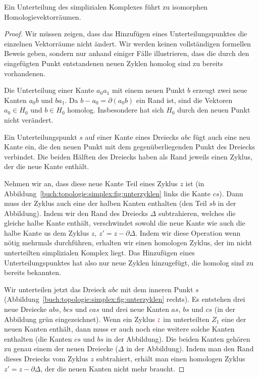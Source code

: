 \begin{satz}
\label{buch:topologie:eulercharakteristik:satz:homologieunterteilung}
Ein Unterteilung des simplizialen Komplexes führt zu isomorphen
Homologievektorräumen.
\end{satz}

\begin{proof}
%
Wir müssen zeigen, dass das Hinzufügen eines Unterteilungspunktes 
die einzelnen Vektorräume nicht ändert.
Wir werden keinen vollständigen formellen Beweis geben, sondern
nur anhand einiger Fälle illustrieren, dass die durch den eingefügten
Punkt entstandenen neuen Zyklen homolog sind zu bereits vorhandenen.

Die Unterteilung einer Kante $a_0a_1$ mit einem neuen Punkt $b$ erzeugt
zwei neue Kanten $a_0b$ und $ba_1$.
Da $b-a_0=\partial (a_0b)$ ein Rand ist, sind die Vektoren $a_0\in H_0$
und $b\in H_0$ homolog.
Insbesondere hat sich $H_0$ durch den neuen Punkt nicht verändert.

Ein Unterteilungspunkt $s$ auf einer Kante eines Dreiecks $abc$ fügt auch
eine neu Kante ein, die den neuen Punkt mit dem gegenüberliegenden
Punkt des Dreiecks verbindet.
Die beiden Hälften des Dreiecks haben als Rand jeweils einen Zyklus,
der die neue Kante enthält.

Nehmen wir an, dass diese neue Kante Teil eines Zyklus $z$ ist
(in Abbildung~\ref{buch:topologie:simplex:fig:unterzyklen} links
die Kante $cs$).
Dann muss der Zyklus auch eine der halben Kanten enthalten (den
Teil $sb$ in der Abbildung).
Indem wir den Rand des Dreiecks $\Delta$ subtrahieren, welches die gleiche
halbe Kante enthält, verschwindet sowohl die neue Kante wie auch die
halbe Kante us dem Zyklus $z$, $z'=z-\partial\Delta$.
Indem wir diese Operation wenn nötig mehrmals durchführen, erhalten
wir einen homologen Zyklus, der im nicht unterteilten simplizialen
Komplex liegt.
Das Hinzufügen eines Unterteilungspunktes hat also nur neue Zyklen
hinzugefügt, die homolog sind zu bereits bekannten.

Wir unterteilen jetzt das Dreieck $abc$ mit dem inneren Punkt $s$
(Abbildung~\ref{buch:topologie:simplex:fig:unterzyklen} rechts).
Es entstehen drei neue Dreiecke $abs$, $bcs$ und $cas$ und drei neue
Kanten $as$, $bs$ und $cs$ (in der Abbildung {\color{darkgreen}grün}
eingezeichnet).
Wenn ein Zyklus ${\color{darkred}z}$ im unterteilten $Z_1$ eine der
neuen Kanten enthält, dann muss er auch noch eine weitere solche
Kanten enthalten (die Kanten $cs$ und $bs$ in der Abbildung).
Die beiden Kanten gehören zu genau einem der neuen Dreiecke ($\Delta$
in der Abbildung).
Indem man den Rand dieses Dreiecks vom Zyklus $z$ subtrahiert, erhält
man einen homologen Zyklus $z'=z-\partial\Delta$, der die neuen Kanten
nicht mehr braucht.


\end{proof}
